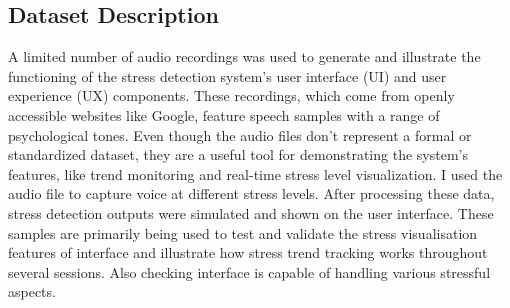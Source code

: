 \documentclass[a4j, twocolumn]{article}
\begin{document}
\subsection{Dataset Description}
  A limited number of audio recordings was used to generate and illustrate the functioning of the stress detection system's user interface (UI) and user experience (UX) components. These recordings, which come from openly accessible websites like Google, feature speech samples with a range of psychological tones. Even though the audio files don't represent a formal or standardized dataset, they are a useful tool for demonstrating the system's features, like trend monitoring and real-time stress level visualization. I used the audio file to capture voice at different stress levels. After processing these data, stress detection outputs were simulated and shown on the user interface. These samples are primarily being used to test and validate the stress visualisation features of interface and illustrate how stress trend tracking works throughout several sessions. Also checking interface is capable of handling various stressful aspects.
\end{document}
